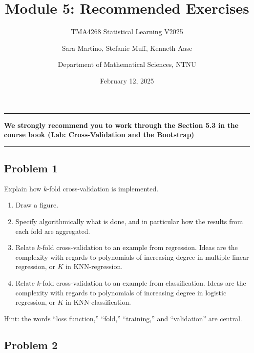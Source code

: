 \documentclass[
]{article}
\title{Module 5: Recommended Exercises}
\subtitle{TMA4268 Statistical Learning V2025}
\author{Sara Martino, Stefanie Muff, Kenneth Aase \and Department of
Mathematical Sciences, NTNU}
\date{February 12, 2025}
\begin{document}
\maketitle

\begin{center}\rule{0.5\linewidth}{0.5pt}\end{center}

\textbf{We strongly recommend you to work through the Section 5.3 in the
course book (Lab: Cross-Validation and the Bootstrap)}

\begin{center}\rule{0.5\linewidth}{0.5pt}\end{center}

\subsection{Problem 1}\label{problem-1}

Explain how \(k\)-fold cross-validation is implemented.

\begin{enumerate}
\def\labelenumi{\alph{enumi})}
\item
  Draw a figure.
\item
  Specify algorithmically what is done, and in particular how the
  results from each fold are aggregated.
\item
  Relate \(k\)-fold cross-validation to an example from regression.
  Ideas are the complexity with regards to polynomials of increasing
  degree in multiple linear regression, or \(K\) in KNN-regression.
\item
  Relate \(k\)-fold cross-validation to an example from classification.
  Ideas are the complexity with regards to polynomials of increasing
  degree in logistic regression, or \(K\) in KNN-classification.
\end{enumerate}

Hint: the words ``loss function,'' ``fold,'' ``training,'' and
``validation'' are central.

\subsection{Problem 2}\label{problem-2}
\end{document}
